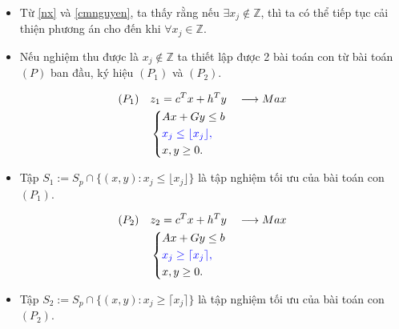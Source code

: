 \documentclass[12pt,a4paper]{report}
\begin{document}
\begin{itemize}
\item Từ \eqref{nx} và \eqref{cmnguyen}, ta thấy rằng nếu $\exists x_j \notin \mathbb{Z}$, thì ta có thể tiếp tục cải thiện phương án cho đến khi $\forall x_j \in \mathbb{Z}$. 
\item Nếu nghiệm thu được là $x_j \notin \mathbb{Z}$ ta thiết lập được 2 bài toán con từ bài toán $(P)$ ban đầu, ký hiệu $(P_1)$ và $(P_2)$.
\end{itemize}



\begin{equation}
    \begin{split}
    (P_1) \quad & z_1=c^Tx+h^Ty \quad \longrightarrow Max \\
                & \left\{\begin{split}
                    &Ax+Gy \leq  b \\
                    &\color{blue} x_j \leq \lfloor x_j \rfloor , \\
                    &x,y \geq 0.
                \end{split}\right.    
    \end{split}
\end{equation}
\begin{itemize}
\item Tập $S_1:=S_p \cap \{ (x,y): x_j \leq \lfloor x_j \rfloor \}$ là tập nghiệm tối ưu của bài toán con $(P_1)$.
\end{itemize}



\begin{equation}
    \begin{split}
    (P_2) \quad & z_2=c^Tx+h^Ty \quad \longrightarrow Max \\
                & \left\{\begin{split}
                    &Ax+Gy \leq  b \\
                    &\color{blue} x_j \geq \lceil x_j \rceil , \\
                    &x,y \geq 0.
                \end{split}\right.    
    \end{split}
\end{equation}
\begin{itemize}
\item Tập $S_2:=S_p \cap \{ (x,y): x_j \geq \lceil x_j \rceil \}$ là tập nghiệm tối ưu của bài toán con $(P_2)$.
\end{itemize}
\end{document}
